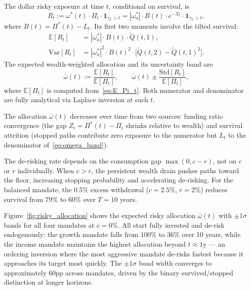\documentclass[11pt,a4paper]{article}
\numberwithin{equation}{section}
\newcommand{\E}{\mathbb{E}}
\newcommand{\Var}{\mathrm{Var}}
\newcommand{\ind}{\mathbf{1}}
\begin{document}
The dollar risky exposure at time $t$, conditional on survival, is
\begin{equation}\label{eq:R_t_def}
R_t := \omega^*(t) \cdot \Pi_t \cdot \ind_{\tau_L > t} 
= |\omega^*_a| \cdot B(t) \cdot e^{-X_t} \cdot \ind_{\tau_L > t},
\end{equation}
where $B(t) = \Pi^*(t) - L_t$. Its first two moments involve the tilted 
survival:
\begin{align}
\E[R_t] &= |\omega^*_a| \cdot B(t) \cdot \widetilde{Q}(t, 1), 
  \label{eq:E_Rt}\\
\Var[R_t] &= |\omega^*_a|^2 \cdot B(t)^2 \cdot 
  \bigl[\widetilde{Q}(t, 2) - \widetilde{Q}(t, 1)^2\bigr].
  \label{eq:Var_Rt}
\end{align}
The expected wealth-weighted allocation and its uncertainty band are
\begin{equation}\label{eq:omega_band}
\bar{\omega}(t) := \frac{\E[R_t]}{\E[\Pi_t]}, \qquad
\bar{\omega}(t) \pm \frac{\mathrm{Std}[R_t]}{\E[\Pi_t]},
\end{equation}
where $\E[\Pi_t]$ is computed from~\eqref{eq:E_Pi_t}. Both numerator 
and denominator are fully analytical via Laplace inversion at each $t$.

The allocation $\bar{\omega}(t)$ decreases over time from two sources: 
funding ratio convergence (the gap $Z_t = \Pi^*(t) - \Pi_t$ shrinks 
relative to wealth) and survival attrition (stopped paths contribute 
zero exposure to the numerator but $L_t$ to the denominator 
of~\eqref{eq:omega_band}).

The de-risking rate depends on the consumption gap $\max(0, c - r)$, not 
on $c$ or $r$ individually. When $c > r$, the persistent wealth drain 
pushes paths toward the floor, increasing stopping probability and 
accelerating de-risking. For the balanced mandate, the $0.5\%$ excess 
withdrawal ($c = 2.5\%$, $r = 2\%$) reduces survival from $79\%$ to 
$60\%$ over $T = 10$ years.



Figure~\ref{fig:risky_allocation} shows the expected risky allocation 
$\bar{\omega}(t)$ with $\pm 1\sigma$ bands for all four mandates at 
$c = 0\%$. All start fully invested and de-risk endogenously: the 
growth mandate falls from $100\%$ to $36\%$ over 10 years, while the 
income mandate maintains the highest allocation beyond $t \approx 1$y 
--- an ordering inversion where the most aggressive mandate de-risks 
fastest because it approaches its target most quickly. The $\pm 1\sigma$ 
band width converges to approximately $60$pp across mandates, driven 
by the binary survived/stopped distinction at longer horizons.
\end{document}
